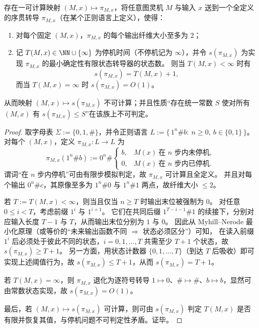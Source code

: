 \begin{theorem}[最小状态复杂度可编码停机时间]\label{thm:conclusion-minimal-state-complexity-halting}
存在一可计算映射 \((M,x)\mapsto \pi_{M,x}\)，将任意图灵机 \(M\) 与输入 \(x\) 送到一个全定义的序贯转导 \(\pi_{M,x}\)（在某个正则语言上定义），使得：
\begin{enumerate}
  \item 对每个固定 \((M,x)\)，\(\pi_{M,x}\) 的每个输出纤维大小至多为 \(2\)；
  \item 记 \(T(M,x)\in\NN\cup\{\infty\}\) 为停机时间（不停机记为 \(\infty\)），并令 \(s(\pi_{M,x})\) 为实现 \(\pi_{M,x}\) 的最小确定性有限状态转导器的状态数。
  则当 \(T(M,x)<\infty\) 时有
  \[
  s(\pi_{M,x})=T(M,x)+1,
  \]
  而当 \(T(M,x)=\infty\) 时 \(s(\pi_{M,x})=O(1)\)。
\end{enumerate}
从而映射 \((M,x)\mapsto s(\pi_{M,x})\) 不可计算；并且性质“存在统一常数 \(S\) 使对所有 \((M,x)\) 有 \(s(\pi_{M,x})\le S\)”在该族上不可判定。
\end{theorem}
\begin{proof}
取字母表 \(\Sigma:=\{0,1,\#\}\)，并令正则语言
\(
L:=\{\,1^n\# b:\ n\ge 0,\ b\in\{0,1\}\,\}
\)。
对每个 \((M,x)\)，定义 \(\pi_{M,x}:L\to L\) 为
\[
\pi_{M,x}(1^n\# b)
:=
0^n\#\begin{cases}
b,& M(x)\ \text{在 }n\text{ 步内未停机},\\
0,& M(x)\ \text{在 }n\text{ 步内已停机}.
\end{cases}
\]
谓词“在 \(n\) 步内停机”可由有限步模拟判定，故 \(\pi_{M,x}\) 可计算且全定义。
并且对每个输出 \(0^n\# c\)，其原像至多为 \(1^n\#0\) 与 \(1^n\#1\) 两点，故纤维大小 \(\le 2\)。
\par
若 \(T:=T(M,x)<\infty\)，则当且仅当 \(n\ge T\) 时输出末位被强制为 \(0\)。
对任意 \(0\le i<T\)，考虑前缀 \(1^i\) 与 \(1^{i+1}\)。
它们在共同后缀 \(1^{T-i-1}\#1\) 的续接下，分别对应输入长度 \(T-1\) 与 \(T\)，从而输出末位分别为 \(1\) 与 \(0\)。
因此从 Myhill--Nerode 最小化原理（或等价的“未来输出函数不同 \(\Rightarrow\) 状态必须区分”）可知，
在读入前缀 \(1^i\) 后必须处于彼此不同的状态，\(i=0,1,\dots,T\) 共需至少 \(T+1\) 个状态，故 \(s(\pi_{M,x})\ge T+1\)。
另一方面，用状态计数器 \(\{0,1,\dots,T\}\)（到达 \(T\) 后吸收）即可实现上述阈值行为，故 \(s(\pi_{M,x})\le T+1\)，从而 \(s(\pi_{M,x})=T+1\)。
\par
若 \(T(M,x)=\infty\)，则 \(\pi_{M,x}\) 退化为逐符号转导 \(1\mapsto 0\)、\(\#\mapsto \#\)、\(b\mapsto b\)，显然可由常数状态实现，故 \(s(\pi_{M,x})=O(1)\)。
\par
最后，若 \((M,x)\mapsto s(\pi_{M,x})\) 可计算，则可由 \(s(\pi_{M,x})\) 判定 \(T(M,x)\) 是否有限并恢复其值，与停机问题不可判定性矛盾。证毕。
\end{proof}

\endinput

